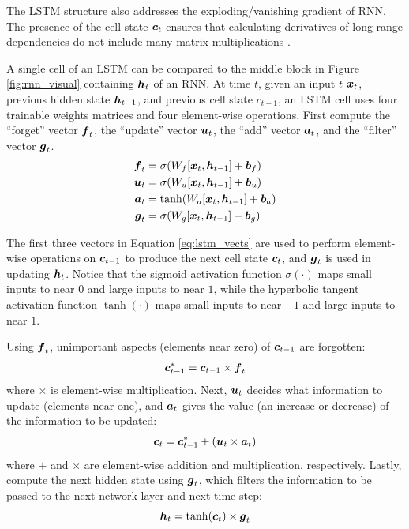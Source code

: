 The LSTM structure also addresses the exploding/vanishing gradient of RNN. The presence of the cell state $\boldsymbol{c}_t$ ensures that calculating derivatives of long-range dependencies do not include many matrix multiplications \cite{hochreiter1997}.

A single cell of an LSTM can be compared to the middle block in Figure \ref{fig:rnn_visual} containing $\boldsymbol{h}_t$ of an RNN. At time $t$, given an input $t$ $\boldsymbol{x}_t$, previous hidden state $\boldsymbol{h}_{t-1}$, and previous cell state $c_{t-1}$, an LSTM cell uses four trainable weights matrices and four element-wise operations. First compute the ``forget'' vector $\boldsymbol{f}_t$, the ``update'' vector $\boldsymbol{u}_t$, the ``add'' vector $\boldsymbol{a}_t$, and the ``filter'' vector $\boldsymbol{g}_t$.
\begin{equation}
\begin{split}
  \boldsymbol{f}_t &= \sigma(W_f [\boldsymbol{x}_t, \boldsymbol{h}_{t-1}] + \boldsymbol{b}_f) \\
  \boldsymbol{u}_t &= \sigma(W_u [\boldsymbol{x}_t, \boldsymbol{h}_{t-1}] + \boldsymbol{b}_u) \\
  \boldsymbol{a}_t &= \tanh(W_a [\boldsymbol{x}_t, \boldsymbol{h}_{t-1}] + \boldsymbol{b}_a) \\
  \boldsymbol{g}_t &= \sigma(W_g [\boldsymbol{x}_t, \boldsymbol{h}_{t-1}] + \boldsymbol{b}_g)
\end{split}
  \label{eq:lstm_vects}
\end{equation}

The first three vectors in Equation \ref{eq:lstm_vects} are used to perform element-wise operations on $\boldsymbol{c}_{t-1}$ to produce the next cell state $\boldsymbol{c}_t$, and $\boldsymbol{g}_t$ is used in updating $\boldsymbol{h}_t$. Notice that the sigmoid activation function $\sigma(\cdot)$ maps small inputs to near $0$ and large inputs to near $1$, while the hyperbolic tangent activation function $\tanh(\cdot)$ maps small inputs to near $-1$ and large inputs to near $1$. 

Using $\boldsymbol{f}_t$, unimportant aspects (elements near zero) of $\boldsymbol{c}_{t-1}$ are forgotten:
\begin{equation}
  \boldsymbol{c}_{t-1}^* = \boldsymbol{c}_{t-1} \times \boldsymbol{f}_t
  \label{eq:lstm_forget}
\end{equation}
where $\times$ is element-wise multiplication. Next, $\boldsymbol{u}_t$ decides what information to update (elements near one), and $\boldsymbol{a}_t$ gives the value (an increase or decrease) of the information to be updated:
\begin{equation}
  \boldsymbol{c}_t = \boldsymbol{c}_{t-1}^* + \left( \boldsymbol{u}_t \times \boldsymbol{a}_t \right)
  \label{eq:lstm_update}
\end{equation}
where $+$ and $\times$ are element-wise addition and multiplication, respectively. Lastly, compute the next hidden state using $\boldsymbol{g}_t$, which filters the information to be passed to the next network layer and next time-step:
\begin{equation}
  \boldsymbol{h}_t = \tanh(\boldsymbol{c}_t) \times \boldsymbol{g}_t
  \label{eq:lstm_filter}
\end{equation}

